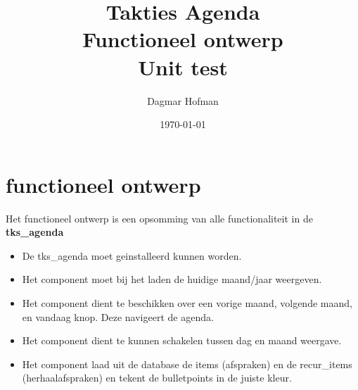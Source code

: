 \documentclass{article}
\title{ Takties Agenda \\ Functioneel ontwerp \\ Unit test  }
\author{ Dagmar Hofman  }
\date{ \today }
\begin{document}
\maketitle
\newpage
\tableofcontents
\newpage
\section{functioneel ontwerp}

Het functioneel ontwerp is een opsomming van alle functionaliteit in de \textbf{tks_agenda} \\
\begin{itemize}
\item De tks\_agenda moet geinstalleerd kunnen worden. \\
\item Het component moet bij het laden de huidige maand/jaar weergeven. \\
\item Het component dient te beschikken over een vorige maand, volgende maand, en vandaag knop. Deze navigeert de agenda. \\
\item Het component dient te kunnen schakelen tussen dag en maand weergave. \\
\item Het component laad uit de database de items (afspraken) en de recur\_items (herhaalafspraken) en tekent de bulletpoints in de juiste kleur. \\

\end{itemize}
\end{document}
